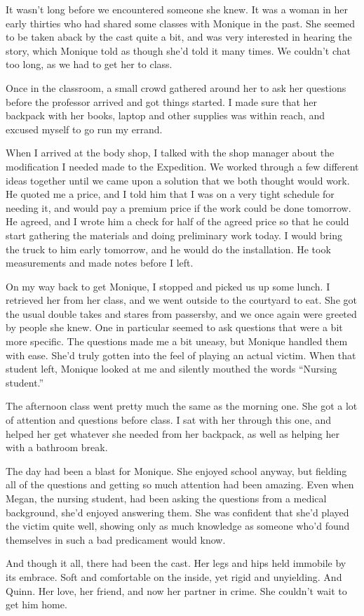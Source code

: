 It wasn't long before we encountered someone she knew. It was a woman in her early thirties
who had shared some classes with Monique in the past. She seemed to be taken aback by the cast
quite a bit, and was very interested in hearing the story, which Monique told as though she'd
told it many times. We couldn't chat too long, as we had to get her to class.

Once in the classroom, a small crowd gathered around her to ask her questions before the
professor arrived and got things started. I made sure that her backpack with her books, laptop
and other supplies was within reach, and excused myself to go run my errand.

When I arrived at the body shop, I talked with the shop manager about the modification I
needed made to the Expedition. We worked through a few different ideas together until we came
upon a solution that we both thought would work. He quoted me a price, and I told him that I was
on a very tight schedule for needing it, and would pay a premium price if the work could be done
tomorrow. He agreed, and I wrote him a check for half of the agreed price so that he could start
gathering the materials and doing preliminary work today. I would bring the truck to him early
tomorrow, and he would do the installation. He took measurements and made notes before I left.

On my way back to get Monique, I stopped and picked us up some lunch. I retrieved her from
her class, and we went outside to the courtyard to eat. She got the usual double takes and
stares from passersby, and we once again were greeted by people she knew. One in particular
seemed to ask questions that were a bit more specific. The questions made me a bit uneasy, but
Monique handled them with ease. She'd truly gotten into the feel of playing an actual victim.
When that student left, Monique looked at me and silently mouthed the words ``Nursing student.''

The afternoon class went pretty much the same as the morning one. She got a lot of
attention and questions before class. I sat with her through this one, and helped her get
whatever she needed from her backpack, as well as helping her with a bathroom break.

\begin{thought}
The day had been a blast for Monique. She enjoyed school anyway, but fielding all of the
questions and getting so much attention had been amazing. Even when Megan, the nursing student,
had been asking the questions from a medical background, she'd enjoyed answering them. She was
confident that she'd played the victim quite well, showing only as much knowledge as someone
who'd found themselves in such a bad predicament would know.

And though it all, there had been the cast. Her legs and hips held immobile by its embrace.
Soft and comfortable on the inside, yet rigid and unyielding. And Quinn. Her love, her friend,
and now her partner in crime. She couldn't wait to get him home.
\end{thought}

